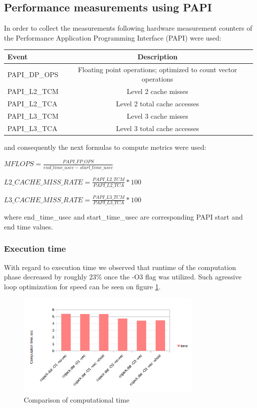 \documentclass{article}
\begin{document}
\subsection{Performance measurements using PAPI}
In order to collect the measurements following hardware measurement counters of the
Performance Application Programming Interface (PAPI) were used:\\
\begin{center}
\begin{tabular}{l|c}
	\hline
	Event & Description \\
	\hline
	PAPI\_DP\_OPS & Floating point operations; optimized to count vector operations \\
	PAPI\_L2\_TCM & Level 2 cache misses \\
	PAPI\_L2\_TCA & Level 2 total cache accesses \\
	PAPI\_L3\_TCM & Level 3 cache misses \\
	PAPI\_L3\_TCA & Level 3 total cache accesses \\
\end{tabular}
\end{center}
and consequently the next formulas to compute metrics were used:
\begin{center}
	$MFLOPS=\frac{PAPI\_FP\_OPS}{end\_time\_usec - start\_time\_usec}$
\end{center}
\begin{center}
	$L2\_CACHE\_MISS\_RATE=\frac{PAPI\_L2\_TCM}{PAPI\_L2\_TCA}*100$
\end{center}
\begin{center}
	$L3\_CACHE\_MISS\_RATE=\frac{PAPI\_L3\_TCM}{PAPI\_L3\_TCA}*100$
\end{center}
where end\_time\_usec and start\_time\_usec are corresponding PAPI start and end time values.

\subsubsection{Execution time}
With regard to execution time we observed that runtime of the computation phase decreased by roughly 23\% once the -O3 flag was utilized. Such agressive loop optimization for speed can be seen on figure \ref{fig:1}.
\begin{figure}[h!]
	\begin{center}
		\includegraphics[width=0.8\textwidth]{comp-time}
		\caption{Comparison of computational time}
		\label{fig:1}
	\end{center}
\end{figure}
\end{document}
